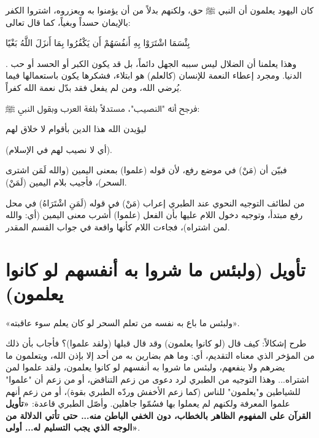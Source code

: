 \begin{fawaid}
كان اليهود يعلمون أن النبي ﷺ حق، ولكنهم بدلاً من أن يؤمنوا به ويعزروه، اشتروا الكفر بالإيمان حسداً وبغياً، كما قال تعالى: \begin{ayah}بِئْسَمَا اشْتَرَوْا بِهِ أَنفُسَهُمْ أَن يَكْفُرُوا بِمَا أَنزَلَ اللَّهُ بَغْيًا\end{ayah}. وهذا يعلمنا أن الضلال ليس سببه الجهل دائماً، بل قد يكون الكبر أو الحسد أو حب الدنيا. ومجرد إعطاء النعمة للإنسان (كالعلم) هو ابتلاء، فشكرها يكون باستعمالها فيما يُرضي الله، ومن لم يفعل فقد بدّل نعمة الله كفراً.
\end{fawaid}

 فرجح  أنه "النصيب"، مستدلاً بلغة العرب وبقول النبي ﷺ: \begin{hadith}ليؤيدن الله هذا الدين بأقوام لا خلاق لهم\end{hadith} (أي لا نصيب لهم في الإسلام).

 فبيّن  أن (مَنْ) في موضع رفع، لأن قوله (علموا) بمعنى اليمين (والله لَمَن اشترى السحر)، فأجيب بلام اليمين (لَمَنْ).

\begin{fawaid}
من لطائف التوجيه النحوي عند الطبري إعراب (مَنْ) في قوله (لَمَنِ اشْتَرَاهُ) في محل رفع مبتدأ، وتوجيه دخول اللام عليها بأن الفعل (علموا) أُشرب معنى اليمين (أي: والله لمن اشتراه)، فجاءت اللام كأنها واقعة في جواب القسم المقدر.
\end{fawaid}

\separator

\section{تأويل (ولبئس ما شروا به أنفسهم لو كانوا يعلمون)}
 «ولبئس ما باع به نفسه من تعلم السحر لو كان يعلم سوء عاقبته».

طرح  إشكالاً: كيف قال (لو كانوا يعلمون) وقد قال قبلها (ولقد علموا)؟
فأجاب بأن ذلك من المؤخر الذي معناه التقديم، أي: وما هم بضارين به من أحد إلا بإذن الله، ويتعلمون ما يضرهم ولا ينفعهم، ولبئس ما شروا به أنفسهم لو كانوا يعلمون، ولقد علموا لمن اشتراه... 
وهذا التوجيه من الطبري لرد دعوى من زعم التناقض، أو من زعم أن "علموا" للشياطين و"يعلمون" للناس (كما زعم الأخفش وردّه الطبري بقوة)، أو من زعم أنهم علموا المعرفة ولكنهم لم يعملوا بها فسُمّوا جاهلين.
وأصّل الطبري قاعدة: \textbf{«تأويل القرآن على المفهوم الظاهر بالخطاب، دون الخفي الباطن منه... حتى تأتي الدلالة من الوجه الذي يجب التسليم له... أولى»}.

